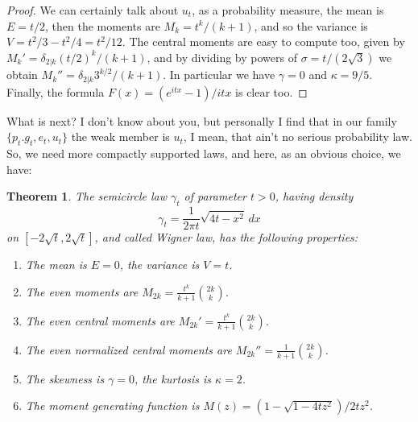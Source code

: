 \documentclass[12pt]{amsbook}
\newtheorem{theorem}{Theorem}[chapter]
\begin{document}
\begin{proof}
We can certainly talk about $u_t$, as a probability measure, the mean is $E=t/2$, then the moments are $M_k=t^k/(k+1)$, and so the variance is $V=t^2/3-t^2/4=t^2/12$. The central moments are easy to compute too, given by $M_k'=\delta_{2|k}(t/2)^k/(k+1)$, and by dividing by powers of $\sigma=t/(2\sqrt{3})$ we obtain $M_k''=\delta_{2|k}3^{k/2}/(k+1)$. In particular we have $\gamma=0$ and $\kappa=9/5$. Finally, the formula $F(x)=(e^{itx}-1)/itx$ is clear too.
\end{proof}

What is next? I don't know about you, but personally I find that in our family $\{p_t.g_t,e_t,u_t\}$ the weak member is $u_t$, I mean, that ain't no serious probability law. So, we need more compactly supported laws, and here, as an obvious choice, we have:


\begin{theorem}
The semicircle law $\gamma_t$ of parameter $t>0$, having density
$$\gamma_t=\frac{1}{2\pi t}\sqrt{4t-x^2}\,dx$$
on $[-2\sqrt{t},2\sqrt{t}]$, and called Wigner law, has the following properties:
\begin{enumerate}
\item The mean is $E=0$, the variance is $V=t$.

\item The even moments are $M_{2k}=\frac{t^k}{k+1}\binom{2k}{k}$.

\item The even central moments are $M_{2k}'=\frac{t^k}{k+1}\binom{2k}{k}$.

\item The even normalized central moments are $M_{2k}''=\frac{1}{k+1}\binom{2k}{k}$.

\item The skewness is $\gamma=0$, the kurtosis is $\kappa=2$.

\item The moment generating function is $M(z)=(1-\sqrt{1-4tz^2})/2tz^2$.
\end{enumerate}
\end{theorem}
\end{document}
